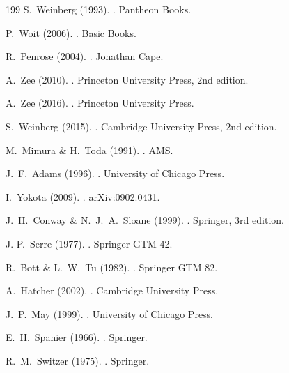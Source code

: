 \documentclass[11pt,a4paper,openright]{book}
\theoremstyle{plain}
\theoremstyle{definition}
\begin{document}
\begin{thebibliography}{199}
S.~Weinberg (1993).
.
\newblock Pantheon Books.

P.~Woit (2006).
.
\newblock Basic Books.

R.~Penrose (2004).
.
\newblock Jonathan Cape.

A.~Zee (2010).
.
\newblock Princeton University Press, 2nd edition.

A.~Zee (2016).
.
\newblock Princeton University Press.

S.~Weinberg (2015).
.
\newblock Cambridge University Press, 2nd edition.


M.~Mimura \& H.~Toda (1991).
.
\newblock AMS.

J.~F.~Adams (1996).
.
\newblock University of Chicago Press.

I.~Yokota (2009).
.
\newblock arXiv:0902.0431.

J.~H.~Conway \& N.~J.~A.~Sloane (1999).
.
\newblock Springer, 3rd edition.

J.-P.~Serre (1977).
.
\newblock Springer GTM 42.

R.~Bott \& L.~W.~Tu (1982).
.
\newblock Springer GTM 82.

A.~Hatcher (2002).
.
\newblock Cambridge University Press.

J.~P.~May (1999).
.
\newblock University of Chicago Press.

E.~H.~Spanier (1966).
.
\newblock Springer.

R.~M.~Switzer (1975).
.
\newblock Springer.

\end{thebibliography}
\end{document}

